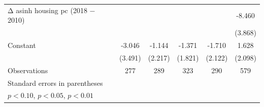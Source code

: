 \begin{table}[htbp]
\begin{tabular}{l*{5}{c}}
\addlinespace
Δ asinh housing pc (2018 − 2010)&                     &                     &                     &                     &      -8.460\sym{**} \\
                    &                     &                     &                     &                     &     (3.868)         \\
\addlinespace
Constant            &      -3.046         &      -1.144         &      -1.371         &      -1.710         &       1.628         \\
                    &     (3.491)         &     (2.217)         &     (1.821)         &     (2.122)         &     (2.098)         \\
\midrule
Observations        &         277         &         289         &         323         &         290         &         579         \\
\bottomrule
\multicolumn{6}{l}{\footnotesize Standard errors in parentheses}\\
\multicolumn{6}{l}{\footnotesize \sym{*} \(p<0.10\), \sym{**} \(p<0.05\), \sym{***} \(p<0.01\)}\\
\end{tabular}
\end{table}
